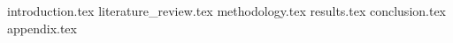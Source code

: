 \documentclass[a4paper,12pt,oneside,openbib,oldfontcommands]{memoir}
\newcommand{\clearemptydoublepage}{\newpage{\thispagestyle{empty}\cleardoublepage}}
\theoremstyle{plain}
\theoremstyle{definition}
\begin{document}
\frontmatter
{}



\clearemptydoublepage

\clearemptydoublepage

\listoftables
{}
\newpage
\listoffigures
{}
\newpage
{}
\renewcommand{\contentsname}{Table of Contents}
\tableofcontents*

\mainmatter
{introduction.tex}
{literature_review.tex}
{methodology.tex}
{results.tex}
{conclusion.tex}
\appendix
{appendix.tex}
\backmatter


\clearemptydoublepage
\end{document}
